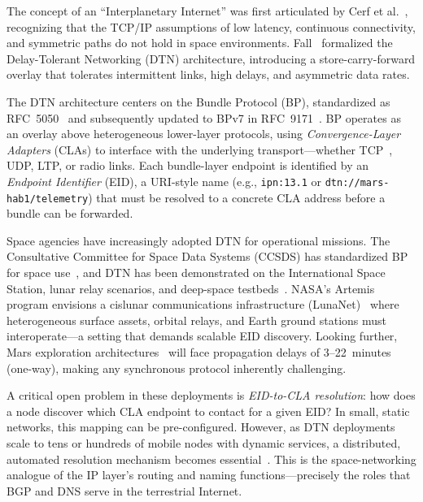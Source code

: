 \documentclass[journal,twocolumn]{IEEEtran}
\begin{document}
The concept of an ``Interplanetary Internet'' was first articulated by Cerf et al.~\cite{burleigh2003interplanetary}, recognizing that the TCP/IP assumptions of low latency, continuous connectivity, and symmetric paths do not hold in space environments. 
Fall~\cite{fall2003dtn} formalized the Delay-Tolerant Networking (DTN) architecture, introducing a store-carry-forward overlay that tolerates intermittent links, high delays, and asymmetric data rates.

The DTN architecture centers on the Bundle Protocol (BP), standardized as RFC~5050~\cite{rfc5050} and subsequently updated to BPv7 in RFC~9171~\cite{rfc9171}. 
BP operates as an overlay above heterogeneous lower-layer protocols, using \emph{Convergence-Layer Adapters} (CLAs) to interface with the underlying transport---whether TCP~\cite{rfc9174}, UDP, LTP, or radio links. 
Each bundle-layer endpoint is identified by an \emph{Endpoint Identifier} (EID), a URI-style name (e.g., \texttt{ipn:13.1} or \texttt{dtn://mars-hab1/telemetry}) that must be resolved to a concrete CLA address before a bundle can be forwarded.

Space agencies have increasingly adopted DTN for operational missions. 
The Consultative Committee for Space Data Systems (CCSDS) has standardized BP for space use~\cite{consultative2015ccsds}, and DTN has been demonstrated on the International Space Station, lunar relay scenarios, and deep-space testbeds~\cite{caini2011dtn}. 
NASA's Artemis program envisions a cislunar communications infrastructure (LunaNet)~\cite{israel2020lunanet} where heterogeneous surface assets, orbital relays, and Earth ground stations must interoperate---a setting that demands scalable EID discovery. 
Looking further, Mars exploration architectures~\cite{alhilal2019sky} will face propagation delays of 3--22~minutes (one-way), making any synchronous protocol inherently challenging.

A critical open problem in these deployments is \emph{EID-to-CLA resolution}: how does a node discover which CLA endpoint to contact for a given EID? 
In small, static networks, this mapping can be pre-configured. 
However, as DTN deployments scale to tens or hundreds of mobile nodes with dynamic services, a distributed, automated resolution mechanism becomes essential~\cite{fraire2021space}. 
This is the space-networking analogue of the IP layer's routing and naming functions---precisely the roles that BGP and DNS serve in the terrestrial Internet.
\end{document}
